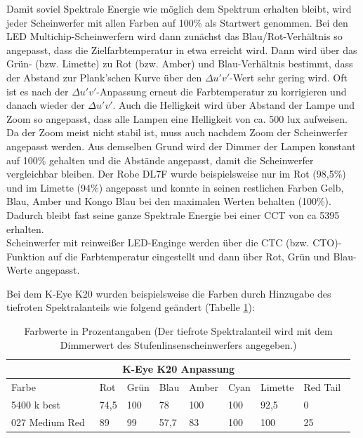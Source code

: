 Damit soviel Spektrale Energie wie möglich dem Spektrum erhalten bleibt, wird jeder Scheinwerfer mit allen Farben auf 100\% als Startwert genommen. Bei den LED Multichip-Scheinwerfern wird dann zunächst das Blau/Rot-Verhältnis so angepasst, dass die Zielfarbtemperatur in etwa erreicht wird. Dann wird über das Grün- (bzw. Limette) zu Rot (bzw. Amber) und Blau-Verhältnis bestimmt, dass der Abstand zur Plank'schen Kurve über den $\Delta u'v'$-Wert sehr gering wird. Oft ist es nach der $\Delta u'v'$-Anpassung erneut die Farbtemperatur zu korrigieren und danach wieder der $\Delta u'v'$. Auch die Helligkeit wird über Abstand der Lampe und Zoom so angepasst, dass alle Lampen eine Helligkeit von ca. 500 lux aufweisen. Da der Zoom meist nicht stabil ist, muss auch nachdem Zoom der Scheinwerfer angepasst werden. Aus demselben Grund wird der Dimmer der Lampen konstant auf 100\% gehalten und die Abstände angepasst, damit die Scheinwerfer vergleichbar bleiben. Der Robe DL7F wurde beispielsweise nur im Rot (98,5\%) und im Limette (94\%) angepasst und konnte in seinen restlichen Farben Gelb, Blau, Amber und Kongo Blau bei den maximalen Werten behalten (100\%). Dadurch bleibt fast seine ganze Spektrale Energie bei einer CCT von ca 5395 erhalten.\\
Scheinwerfer mit reinweißer LED-Enginge werden über die CTC (bzw. CTO)-Funktion auf die Farbtemperatur eingestellt und dann über Rot, Grün und Blau-Werte angepasst. 

Bei dem K-Eye K20 wurden beispielsweise die Farben durch Hinzugabe des tiefroten Spektralanteils wie folgend geändert (Tabelle \ref{t_drehen}):

\begin{table}[htp] 
		\centering
		\begin{tabular}{llllllll}  %
		\toprule
		\multicolumn{8}{c}{\large\sffamily K-Eye K20 Anpassung}\\ 							
		\midrule
		Farbe & Rot & Grün & Blau & Amber & Cyan & Limette &  \glqq Red Tail\grqq\ \\
		 5400 k best & 74,5 & 100 & 78 & 100 & 100 & 92,5 & 0\\
		027 \glqq Medium Red\grqq\ & 89 & 99 & 57,7 & 83 & 100 & 100 & 25\\
		\bottomrule
		\end{tabular}
		\caption{Farbwerte in Prozentangaben (Der tiefrote Spektralanteil wird mit dem Dimmerwert des Stufenlinsenscheinwerfers angegeben.)}	
		\label{t_drehen}
	\end{table}
	
